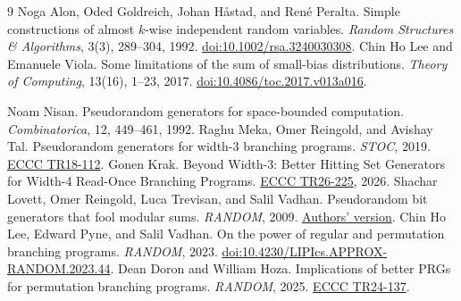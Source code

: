 \documentclass[11pt]{article}
\begin{document}
\begin{thebibliography}{9}
Noga Alon, Oded Goldreich, Johan H\aa stad, and Ren\'e Peralta.
Simple constructions of almost $k$-wise independent random variables.
\emph{Random Structures \& Algorithms}, 3(3), 289--304, 1992.
\href{https://doi.org/10.1002/rsa.3240030308}{doi:10.1002/rsa.3240030308}.
Chin Ho Lee and Emanuele Viola.
Some limitations of the sum of small-bias distributions.
\emph{Theory of Computing}, 13(16), 1--23, 2017.
\href{https://doi.org/10.4086/toc.2017.v013a016}{doi:10.4086/toc.2017.v013a016}.

 Noam Nisan. Pseudorandom generators for space-bounded computation. \emph{Combinatorica}, 12, 449--461, 1992.
 Raghu Meka, Omer Reingold, and Avishay Tal. Pseudorandom generators for width-3 branching programs. \emph{STOC}, 2019. \href{https://eccc.weizmann.ac.il/report/2018/112/}{ECCC TR18-112}.
 Gonen Krak. Beyond Width-3: Better Hitting Set Generators for Width-4 Read-Once Branching Programs. \href{https://eccc.weizmann.ac.il/report/2026/225/}{ECCC TR26-225}, 2026.
 Shachar Lovett, Omer Reingold, Luca Trevisan, and Salil Vadhan. Pseudorandom bit generators that fool modular sums. \emph{RANDOM}, 2009. \href{https://people.seas.harvard.edu/~salil/research/modular-abs.html}{Authors' version}.
 Chin Ho Lee, Edward Pyne, and Salil Vadhan. On the power of regular and permutation branching programs. \emph{RANDOM}, 2023. \href{https://doi.org/10.4230/LIPIcs.APPROX-RANDOM.2023.44}{doi:10.4230/LIPIcs.APPROX-RANDOM.2023.44}.
 Dean Doron and William Hoza. Implications of better PRGs for permutation branching programs. \emph{RANDOM}, 2025. \href{https://eccc.weizmann.ac.il/report/2024/137/}{ECCC TR24-137}.
\end{thebibliography}
\end{document}
